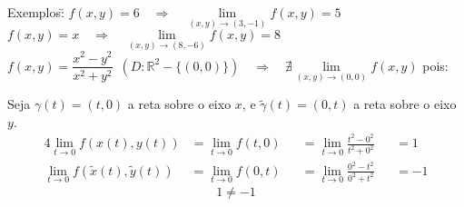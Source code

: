 \documentclass{article}
\begin{document}
\pagebreak

\begin{tabbing}
  Exemplos:\enspace\= $f(x,y) = 6 \quad \Rightarrow \quad \lim\limits_{(x,y) \to (3,-1)} f(x,y) = 5$ \\[10pt]
  \> $f(x,y) = x \quad \Rightarrow \quad \lim\limits_{(x,y) \to (8,-6)} f(x,y) = 8$ \\[10pt]
  \> $f(x,y) = \dfrac{x^2 - y^2}{x^2 + y^2} \enspace \left(D: \mathbb{R}^2 - \{ (0,0) \} \right) \quad \Rightarrow \quad \nexists \lim\limits_{(x,y) \to (0,0)} f(x,y) $ pois: \\[5pt]
  \>\quad\begin{minipage}{400px}
      Seja $\gamma(t) = (t, 0)$ a reta sobre o eixo $x$, e $\widetilde{\gamma}(t) = (0, t)$ a reta sobre o eixo $y$.
      \begin{alignat*}{4}
        \lim_{t\to0} f(x(t), y(t)) &= \lim_{t\to0} f(t, 0) &&= \lim_{t\to0} \frac{t^2 - 0^2}{t^2 + 0^2} &&= 1\\[5pt]
        \lim_{t\to0} f(\widetilde{x}(t), \widetilde{y}(t)) &= \lim_{t\to0} f(0, t) &&= \lim_{t\to0} \frac{0^2 - t^2}{0^2 + t^2} &&= -1
      \end{alignat*}
      \[ 1 \neq -1 \]
      \centering
\end{minipage}
\end{tabbing}
\end{document}
